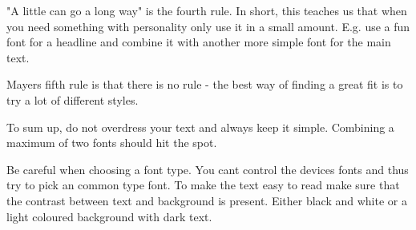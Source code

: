 "A little can go a long way" is the fourth rule. In short, this teaches us that when you need something with personality only use it in a small amount. E.g. use a fun font for a headline and combine it with another more simple font for the main text. 

Mayers fifth rule is that there is no rule - the best way of finding a great fit is to try a lot of different styles. \cite{Font}

To sum up, do not overdress your text and always keep it simple. Combining a maximum of two fonts should hit the spot.\cite{TypeComb} %

Be careful when choosing a font type. You cant control the devices fonts and thus try to pick an common type font.  \cite{Graphic} To make the text easy to read make sure that the contrast between text and background is present. Either black and white or a light coloured background with dark text. \cite{Graphic}